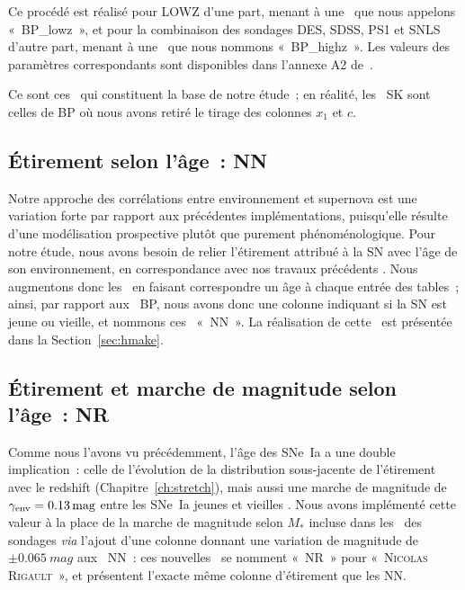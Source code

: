 \documentclass[../main/main.tex]{subfiles}
\begin{document}
Ce procédé est réalisé pour LOWZ d'une part, menant à une \hostlib\ que nous
appelons «~BP\_lowz~», et pour la combinaison des sondages DES, SDSS, PS1 et
SNLS d'autre part, menant à une \hostlib\ que nous nommons «~BP\_highz~». Les
valeurs des paramètres correspondants sont disponibles dans l'annexe A2
de~.

Ce sont ces \hostlib\ qui constituent la base de notre étude~; en réalité, les
\hostlib\ SK sont celles de BP où nous avons retiré le tirage des colonnes $x_1$
et $c$.

\subsection{Étirement selon l'âge~: NN}\label{ssec:nn}

Notre approche des corrélations entre environnement et supernova est une
variation forte par rapport aux précédentes implémentations, puisqu'elle résulte
d'une modélisation prospective plutôt que purement phénoménologique. Pour notre
étude, nous avons besoin de relier l'étirement attribué à la SN avec l'âge de
son environnement, en correspondance avec nos travaux précédents
\citep[][ci-après NN]{nicolas2021}. Nous
augmentons donc les \hostlib\ en faisant correspondre un âge à chaque entrée des
tables~; ainsi, par rapport aux \hostlib\ BP, nous avons donc une colonne
indiquant si la SN est jeune ou vieille, et nommons ces \hostlib\ «~NN~». La
réalisation de cette \hostlib\ est présentée dans la Section~\ref{sec:hmake}.

\subsection{Étirement et marche de magnitude selon l'âge~: NR}\label{ssec:nr}

Comme nous l'avons vu précédemment, l'âge des SNe~Ia a une double implication~:
celle de l'évolution de la distribution sous-jacente de l'étirement avec le
redshift (Chapitre~\ref{ch:stretch}), mais aussi une marche de magnitude de
$\gamma_{\rm env} = \SI{0,13}{mag}$ entre les SNe~Ia jeunes et vieilles
\citep[Chapitre~\ref{ch:stretch},][]{rigault2020}. Nous avons implémenté cette
valeur à la place de la marche de magnitude selon $M_*$ incluse dans les
\wgtmap\ des sondages \textit{via} l'ajout d'une colonne donnant une variation
de magnitude de $\pm\SI{0.065}{mag}$ aux \hostlib\ NN~: ces nouvelles \hostlib\
se nomment «~NR~» pour «~\textsc{Nicolas} \textsc{Rigault}~», et présentent
l'exacte même colonne d'étirement que les NN.
\end{document}
